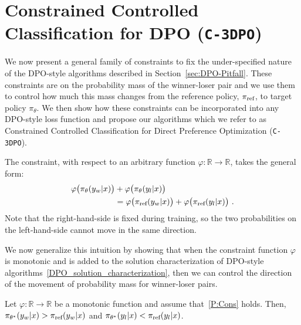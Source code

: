 \section{Constrained Controlled Classification for DPO (\texttt{C-3DPO})}
\label{sec:algos} 

We now present a general family of constraints to fix the under-specified nature of the DPO-style algorithms described in Section~\ref{sec:DPO-Pitfall}. These constraints are on the probability mass of the winner-loser pair and we use them to control how much this mass changes from the reference policy, $\pi_{\textrm{ref}}$, to target policy $\pi_\theta$. We then show how these constraints can be incorporated into any DPO-style loss function and propose our algorithms which we refer to as Constrained Controlled Classification for Direct Preference Optimization (\texttt{C-3DPO}).  

The constraint, with respect to an arbitrary function $\varphi : \mathbb{R} \rightarrow \mathbb{R}$, takes the general form:
%
\begin{align}
\label{P:Cons}
\varphi\big(\pi_{\theta}(y_w|x)\big) &+ \varphi\big(\pi_{\theta}(y_l|x)\big) \\
&= \varphi\big(\piRef(y_w|x)\big) + \varphi\big(\piRef(y_l|x)\big)\ . \nonumber 
\end{align} 
%
Note that the right-hand-side is fixed during training, so the two probabilities on the left-hand-side cannot move in the same direction.

We now generalize this intuition by showing that when the constraint function $\varphi$ is monotonic and is added to the solution characterization of DPO-style algorithms~\eqref{DPO_solution_characterization}, then we can control the direction of the movement of probability mass for winner-loser pairs.

\begin{proposition}
    Let $\varphi : \mathbb{R} \rightarrow \mathbb{R}$ be a monotonic function and assume that~\eqref{P:Cons} holds.
    Then, $\pi_{\theta^{*}}(y_w|x) > \pi_{\textrm{ref}}(y_w|x)$ and $\pi_{\theta^{*}}(y_l|x) < \pi_{\textrm{ref}}(y_l|x)$.
\end{proposition}

